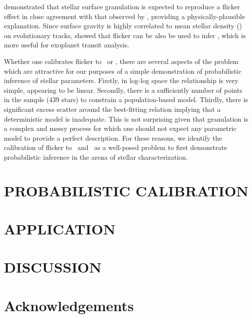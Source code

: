 \documentclass[apjl]{emulateapj}
\begin{document}
\citet{cranmer:2014} demonstrated that stellar surface granulation is expected
to reproduce a flicker effect in close agreement with that observed by 
\citet{bastien:2013}, providing a physically-plausible explanation. Since
surface gravity is highly correlated to mean stellar density (\rhostar) on 
evolutionary tracks, \citet{kipping:2014} showed that flicker can be also 
be used to infer \rhostar, which is more useful for exoplanet transit 
analysis.

Whether one calibrates flicker to \logg\ or \rhostar, there are several aspects
of the problem which are attractive for our purposes of a simple demonstration
of probabilistic inference of stellar parameters. Firstly, in log-log space the
relationship is very simple, appearing to be linear. Secondly, there is a
sufficiently number of points in the sample (439 stars) to constrain a 
population-based model. Thirdly, there is significant excess scatter around the
best-fitting relation implying that a deterministic model is inadequate. This is
not surprising given that granulation is a complex and messy process for which
one should not expect any parametric model to provide a perfect description. For
these reasons, we identify the calibration of flicker to \logg\ and \rhostar\
as a well-posed problem to first demonstrate probabilistic inference in the 
arena of stellar characterization.

\section{PROBABILISTIC CALIBRATION}
\label{sec:HBM}



\section{APPLICATION}
\label{sec:appication}



\section{DISCUSSION}
\label{sec:discussion}



\acknowledgements
\section*{Acknowledgements}
\end{document}
